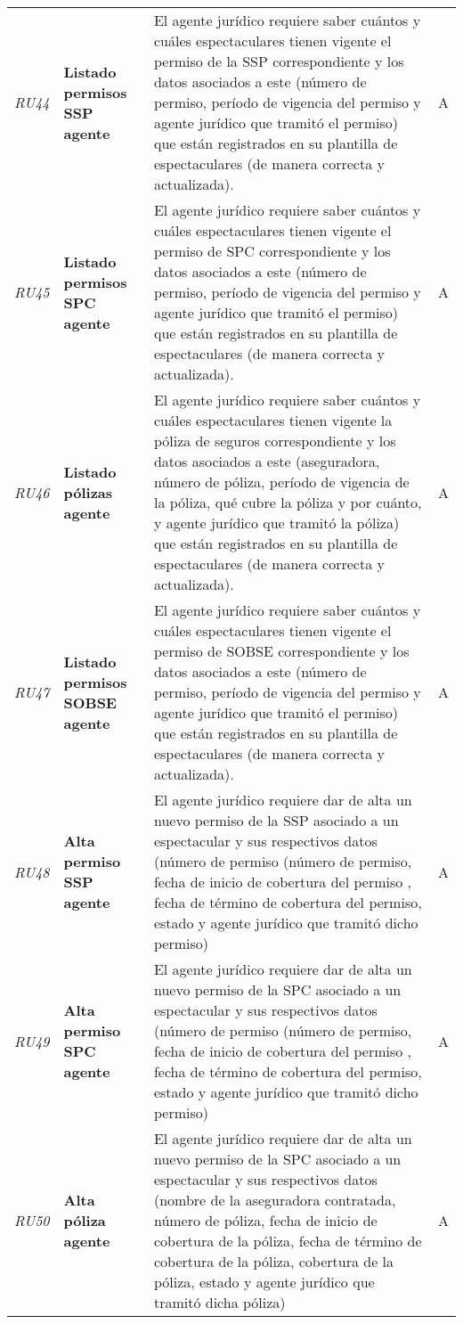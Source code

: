 \begin{longtable}[H]{m{2cm}m{3cm}m{5cm}m{2cm}}
\textit{RU44} &\textbf{Listado permisos SSP agente} & El agente jurídico requiere saber cuántos y cuáles espectaculares tienen vigente el permiso de la SSP correspondiente y los datos asociados a este (número de permiso, período de vigencia del permiso y agente jurídico que tramitó el permiso) que están registrados en su plantilla de espectaculares (de manera correcta y actualizada). & A\tabularnewline
\textit{RU45} &\textbf{Listado permisos SPC agente} & El agente jurídico requiere saber cuántos y cuáles espectaculares tienen vigente el permiso de SPC correspondiente y los datos asociados a este (número de permiso, período de  vigencia del permiso y agente jurídico que tramitó el permiso) que están registrados en su plantilla de espectaculares (de manera correcta y actualizada). & A\tabularnewline
\textit{RU46} &\textbf{Listado pólizas agente} & El agente jurídico requiere saber cuántos y cuáles espectaculares tienen vigente la póliza de seguros correspondiente y los datos asociados a este (aseguradora, número de póliza, período de vigencia de la póliza, qué cubre la póliza y por cuánto, y agente jurídico que tramitó la póliza) que están registrados en su plantilla de espectaculares (de manera correcta y actualizada). & A\tabularnewline
\textit{RU47} &\textbf{Listado permisos SOBSE agente} & El agente jurídico requiere saber cuántos y cuáles espectaculares tienen vigente el permiso de SOBSE correspondiente y los datos asociados a este (número de permiso, período de  vigencia del permiso y agente jurídico que tramitó el permiso) que están registrados en su plantilla de espectaculares (de manera correcta y actualizada). & A\tabularnewline
\textit{RU48} &\textbf{Alta permiso SSP agente} & El agente jurídico requiere dar de alta un nuevo permiso de la SSP asociado a un espectacular y sus respectivos datos (número de permiso (número de permiso, fecha de inicio de cobertura del permiso , fecha de término de cobertura del permiso, estado y agente jurídico que tramitó dicho permiso) & A\tabularnewline
\textit{RU49} &\textbf{Alta permiso SPC agente} & El agente jurídico requiere dar de alta un nuevo permiso de la SPC asociado a un espectacular y sus respectivos datos (número de permiso (número de permiso, fecha de inicio de cobertura del permiso , fecha de término de cobertura del permiso, estado y agente jurídico que tramitó dicho permiso) & A\tabularnewline
\textit{RU50} &\textbf{Alta póliza agente} & El agente jurídico requiere dar de alta un nuevo permiso de la SPC asociado a un espectacular y sus respectivos datos (nombre de la aseguradora contratada, número de póliza, fecha de inicio de cobertura de la póliza, fecha de término de cobertura de la póliza, cobertura de la póliza, estado y agente jurídico que tramitó dicha póliza) & A\tabularnewline

\end{longtable}
